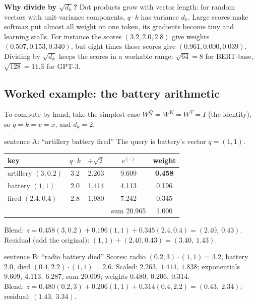 \documentclass[11pt]{article}
\begin{document}
\textbf{Why divide by $\sqrt{d_k}$?} Dot products grow with vector length: for random vectors with unit-variance components, $q\cdot k$ has variance $d_k$. Large scores make softmax put almost all weight on one token, its gradients become tiny and learning stalls. For instance the scores $(3.2,2.0,2.8)$ give weights $(0.507,0.153,0.340)$, but eight times those scores give $(0.961,0.000,0.039)$. Dividing by $\sqrt{d_k}$ keeps the scores in a workable range: $\sqrt{64}=8$ for BERT-base, $\sqrt{128}=11.3$ for GPT-3.

\subsection{Worked example: the battery arithmetic}\label{sec:worked}
To compute by hand, take the simplest case $W^Q=W^K=W^V=I$ (the identity), so $q=k=v=x$, and $d_k=2$.
\begin{example}{sentence A: ``artillery battery fired''}
The query is battery's vector $q=(1,1)$.
\begin{center}\small\renewcommand{\arraystretch}{1.25}
\begin{tabular}{lcccc}\toprule
\textbf{key} & $q\cdot k$ & $\div\sqrt2$ & $e^{(\cdot)}$ & \textbf{weight}\\\midrule
artillery $(3,0.2)$ & 3.2 & 2.263 & 9.609 & \textbf{0.458}\\
battery $(1,1)$ & 2.0 & 1.414 & 4.113 & 0.196\\
fired $(2.4,0.4)$ & 2.8 & 1.980 & 7.242 & 0.345\\\midrule
 & & & sum 20.965 & 1.000\\\bottomrule
\end{tabular}\end{center}
Blend: $z=0.458(3,0.2)+0.196(1,1)+0.345(2.4,0.4)=(2.40,\ 0.43)$.\\
Residual (add the original): $(1,1)+(2.40,0.43)=(3.40,\ 1.43)$.
\end{example}
\begin{example}{sentence B: ``radio battery died''}
Scores: radio $(0.2,3)\cdot(1,1)=3.2$, battery $2.0$, died $(0.4,2.2)\cdot(1,1)=2.6$. Scaled: $2.263,\ 1.414,\ 1.838$; exponentials $9.609,\ 4.113,\ 6.287$, sum $20.009$; weights $0.480,\ 0.206,\ 0.314$.\\
Blend: $z=0.480(0.2,3)+0.206(1,1)+0.314(0.4,2.2)=(0.43,\ 2.34)$; residual: $(1.43,\ 3.34)$.
\end{example}
\end{document}
